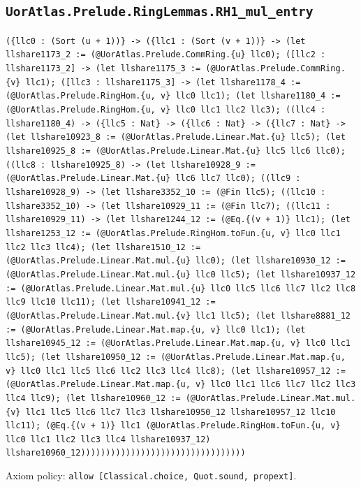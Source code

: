 \documentclass[11pt]{article}
\begin{document}
\subsection*{\texttt{UorAtlas.Prelude.RingLemmas.RH1\_mul\_entry}}
\noindent\texttt{(\{llc0 : (Sort (u + 1))\} -> (\{llc1 : (Sort (v + 1))\} -> (let llshare1173\_2 := (@UorAtlas.Prelude.CommRing.\{u\} llc0); ([llc2 : llshare1173\_2] -> (let llshare1175\_3 := (@UorAtlas.Prelude.CommRing.\{v\} llc1); ([llc3 : llshare1175\_3] -> (let llshare1178\_4 := (@UorAtlas.Prelude.RingHom.\{u, v\} llc0 llc1); (let llshare1180\_4 := (@UorAtlas.Prelude.RingHom.\{u, v\} llc0 llc1 llc2 llc3); ((llc4 : llshare1180\_4) -> (\{llc5 : Nat\} -> (\{llc6 : Nat\} -> (\{llc7 : Nat\} -> (let llshare10923\_8 := (@UorAtlas.Prelude.Linear.Mat.\{u\} llc5); (let llshare10925\_8 := (@UorAtlas.Prelude.Linear.Mat.\{u\} llc5 llc6 llc0); ((llc8 : llshare10925\_8) -> (let llshare10928\_9 := (@UorAtlas.Prelude.Linear.Mat.\{u\} llc6 llc7 llc0); ((llc9 : llshare10928\_9) -> (let llshare3352\_10 := (@Fin llc5); ((llc10 : llshare3352\_10) -> (let llshare10929\_11 := (@Fin llc7); ((llc11 : llshare10929\_11) -> (let llshare1244\_12 := (@Eq.\{(v + 1)\} llc1); (let llshare1253\_12 := (@UorAtlas.Prelude.RingHom.toFun.\{u, v\} llc0 llc1 llc2 llc3 llc4); (let llshare1510\_12 := (@UorAtlas.Prelude.Linear.Mat.mul.\{u\} llc0); (let llshare10930\_12 := (@UorAtlas.Prelude.Linear.Mat.mul.\{u\} llc0 llc5); (let llshare10937\_12 := (@UorAtlas.Prelude.Linear.Mat.mul.\{u\} llc0 llc5 llc6 llc7 llc2 llc8 llc9 llc10 llc11); (let llshare10941\_12 := (@UorAtlas.Prelude.Linear.Mat.mul.\{v\} llc1 llc5); (let llshare8881\_12 := (@UorAtlas.Prelude.Linear.Mat.map.\{u, v\} llc0 llc1); (let llshare10945\_12 := (@UorAtlas.Prelude.Linear.Mat.map.\{u, v\} llc0 llc1 llc5); (let llshare10950\_12 := (@UorAtlas.Prelude.Linear.Mat.map.\{u, v\} llc0 llc1 llc5 llc6 llc2 llc3 llc4 llc8); (let llshare10957\_12 := (@UorAtlas.Prelude.Linear.Mat.map.\{u, v\} llc0 llc1 llc6 llc7 llc2 llc3 llc4 llc9); (let llshare10960\_12 := (@UorAtlas.Prelude.Linear.Mat.mul.\{v\} llc1 llc5 llc6 llc7 llc3 llshare10950\_12 llshare10957\_12 llc10 llc11); (@Eq.\{(v + 1)\} llc1 (@UorAtlas.Prelude.RingHom.toFun.\{u, v\} llc0 llc1 llc2 llc3 llc4 llshare10937\_12) llshare10960\_12)))))))))))))))))))))))))))))))))}\par
\noindent Axiom policy: \texttt{allow [Classical.choice, Quot.sound, propext]}.\par
\end{document}
